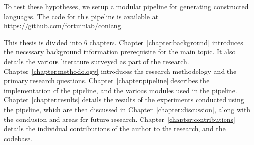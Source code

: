 


To test these hypotheses, we setup a modular pipeline for generating constructed languages. The code for this pipeline is available at 
\url{https://github.com/fortuinlab/conlang}. 

This thesis is divided into 6 chapters. Chapter~\ref{chapter:background} introduces the necessary background information prerequisite for the main topic.
It also details the various literature surveyed as part of the research.  Chapter~\ref{chapter:methodology} introduces the research methodology and the
primary research questions.  Chapter~\ref{chapter:pipeline} describes the implementation of the pipeline, and the various modules used in the pipeline.
 Chapter~\ref{chapter:results} details the results of the experiments conducted using the pipeline, which are then discussed in  Chapter~\ref{chapter:discussion},
along with the conclusion and areas for future research.  Chapter~\ref{chapter:contributions} details the individual contributions of the author to the research, and the codebase. 